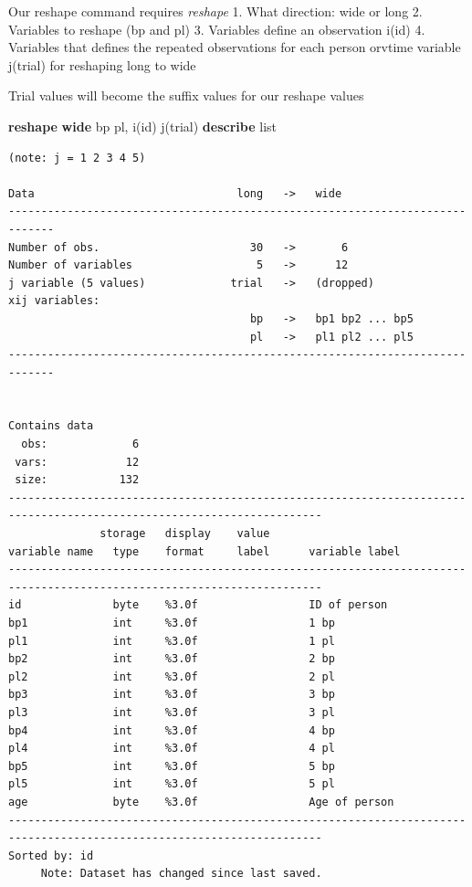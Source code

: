 \documentclass[
]{book}
\newenvironment{Shaded}{\begin{snugshade}}{\end{snugshade}}
\newcommand{\KeywordTok}[1]{\textcolor[rgb]{0.13,0.29,0.53}{\textbf{#1}}}
\newcommand{\NormalTok}[1]{#1}
\newcommand{\OtherTok}[1]{\textcolor[rgb]{0.56,0.35,0.01}{#1}}
\begin{document}
Our reshape command requires \emph{reshape}
1. What direction: wide or long
2. Variables to reshape (bp and pl)
3. Variables define an observation i(id)
4. Variables that defines the repeated observations for each person orvtime variable j(trial) for reshaping long to wide

Trial values will become the suffix values for our reshape values

\begin{Shaded}
\begin{Highlighting}[]
\KeywordTok{reshape} \KeywordTok{wide}\NormalTok{ bp pl, i(id) j(trial)}
\KeywordTok{describe}
\OtherTok{list}
\end{Highlighting}
\end{Shaded}

\begin{verbatim}
(note: j = 1 2 3 4 5)

Data                               long   ->   wide
-----------------------------------------------------------------------------
Number of obs.                       30   ->       6
Number of variables                   5   ->      12
j variable (5 values)             trial   ->   (dropped)
xij variables:
                                     bp   ->   bp1 bp2 ... bp5
                                     pl   ->   pl1 pl2 ... pl5
-----------------------------------------------------------------------------


Contains data
  obs:             6                          
 vars:            12                          
 size:           132                          
----------------------------------------------------------------------------------------------------------------------
              storage   display    value
variable name   type    format     label      variable label
----------------------------------------------------------------------------------------------------------------------
id              byte    %3.0f                 ID of person
bp1             int     %3.0f                 1 bp
pl1             int     %3.0f                 1 pl
bp2             int     %3.0f                 2 bp
pl2             int     %3.0f                 2 pl
bp3             int     %3.0f                 3 bp
pl3             int     %3.0f                 3 pl
bp4             int     %3.0f                 4 bp
pl4             int     %3.0f                 4 pl
bp5             int     %3.0f                 5 bp
pl5             int     %3.0f                 5 pl
age             byte    %3.0f                 Age of person
----------------------------------------------------------------------------------------------------------------------
Sorted by: id
     Note: Dataset has changed since last saved.


\end{verbatim}
\end{document}
